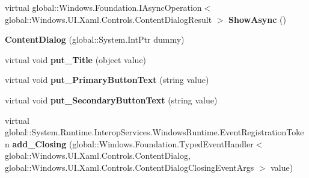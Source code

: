 \begin{DoxyCompactItemize}
\mbox{\label{class_windows_1_1_u_i_1_1_xaml_1_1_controls_1_1_content_dialog_acc6835ff256e59954bab47b9ce049071}} 
virtual global\+::\+Windows.\+Foundation.\+I\+Async\+Operation$<$ global\+::\+Windows.\+U\+I.\+Xaml.\+Controls.\+Content\+Dialog\+Result $>$ {\bfseries Show\+Async} ()
\item 
\mbox{\label{class_windows_1_1_u_i_1_1_xaml_1_1_controls_1_1_content_dialog_ac5cd215d832532c7377d5d28dc7c9e2f}} 
{\bfseries Content\+Dialog} (global\+::\+System.\+Int\+Ptr dummy)
\item 
\mbox{\label{class_windows_1_1_u_i_1_1_xaml_1_1_controls_1_1_content_dialog_a0a34b740496886293e402395da09194f}} 
virtual void {\bfseries put\+\_\+\+Title} (object value)
\item 
\mbox{\label{class_windows_1_1_u_i_1_1_xaml_1_1_controls_1_1_content_dialog_adcf99702d4b190842bce4c72ae4f8e60}} 
virtual void {\bfseries put\+\_\+\+Primary\+Button\+Text} (string value)
\item 
\mbox{\label{class_windows_1_1_u_i_1_1_xaml_1_1_controls_1_1_content_dialog_a0c1be8e4e5f2ada768536bad2d8ca78b}} 
virtual void {\bfseries put\+\_\+\+Secondary\+Button\+Text} (string value)
\item 
\mbox{\label{class_windows_1_1_u_i_1_1_xaml_1_1_controls_1_1_content_dialog_a112044e25750429e881c4e8edede4a3b}} 
virtual global\+::\+System.\+Runtime.\+Interop\+Services.\+Windows\+Runtime.\+Event\+Registration\+Token {\bfseries add\+\_\+\+Closing} (global\+::\+Windows.\+Foundation.\+Typed\+Event\+Handler$<$ global\+::\+Windows.\+U\+I.\+Xaml.\+Controls.\+Content\+Dialog, global\+::\+Windows.\+U\+I.\+Xaml.\+Controls.\+Content\+Dialog\+Closing\+Event\+Args $>$ value)
\item 
\mbox{\label{class_windows_1_1_u_i_1_1_xaml_1_1_controls_1_1_content_dialog_a13479534a17ee5bc6c49534a00724ca9}} 

\end{DoxyCompactItemize}
